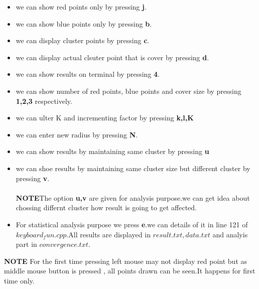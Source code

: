 \documentclass[a4paper,10pt]{report}
\begin{document}
\begin{itemize}
 \item we can show red points only by pressing \textbf{j}.
 \item we can show blue points only by pressing \textbf{b}.
 \item we can display cluster points by pressing \textbf{c}.
 \item we can display actual clsuter point that is cover by pressing \textbf{d}.
 \item we can show results on terminal by pressing \textbf{4}.
 \item we can show number of red points, blue points and cover size by pressing \textbf{1,2,3} respectively.
 \item we can ulter K and incrementing factor by pressing \textbf{k,l,K}
 \item we can enter new radius by pressing \textbf{N}.
 \item we can show results by maintaining same cluster by pressing \textbf{u}
 \item we can shoe results by maintaining same cluster size but different cluster by pressing \textbf{v}.\\ \\
 \textbf{NOTE}The option \textbf{u,v} are given for analysis purpose.we can get idea about chossing differnt cluster how 
 result is going to get affected.
 \item For statistical analysis purpose we press \textbf{e}.we can details of it in line 121 of $keyboard_fun.cpp$.All results
 are displayed in $result.txt,data.txt$ and analyis part in $convergence.txt$.
 \end{itemize}
 \textbf{NOTE} For the first time pressing left mouse may not display red point but as middle mouse button 
 is pressed , all points drawn can be seen.It happens for first time only.
 
\end{document}
